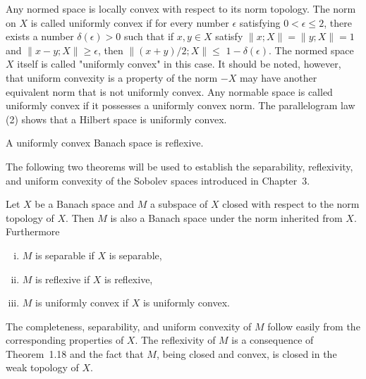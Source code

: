 \begin{para}
  Any normed space is locally convex with respect to its norm topology.
  The norm on $X$ is called uniformly convex if for every number $\epsilon$ 
  satisfying $0<\epsilon \leq 2$, there exists a number $\delta(\epsilon)>0$ such 
  that if $x, y \in X$ satisfy $\|x ; X\|=\|y ; X\|=1$ and $\|x-y ; X\| \geq \epsilon$, then $\|(x+y) / 2 ; X\| \leq$ $1-\delta(\epsilon)$.
  The normed space $X$ itself is called "uniformly convex" in this case.
  It should be noted, however, that uniform convexity is a property of the norm $-X$ 
  may have another equivalent norm that is not uniformly convex. Any normable space 
  is called uniformly convex if it possesses a uniformly convex norm.
  The parallelogram law (2) shows that a Hilbert space is uniformly convex.
\end{para}

\begin{theorem}
  A uniformly convex Banach space is reflexive.
\end{theorem}

The following two theorems will be used to establish the separability, reflexivity, and uniform convexity of the Sobolev spaces introduced in Chapter~3.


\begin{theorem}
  Let $X$ be a Banach space and $M$ a subspace of $X$ closed with respect to the norm 
  topology of $X$. Then $M$ is also a Banach space under the norm inherited from $X$. 
  Furthermore
  \begin{enumerate}[(i)]
    \item $M$ is separable if $X$ is separable,
    \item $M$ is reflexive if $X$ is reflexive,
    \item $M$ is uniformly convex if $X$ is uniformly convex.
  \end{enumerate}
\end{theorem}

The completeness, separability, and uniform convexity of $M$ follow easily from the corresponding properties of $X$. The reflexivity of $M$ is a consequence of Theorem~1.18 and the fact that $M$, being closed and convex, is closed in the weak topology of $X$.

